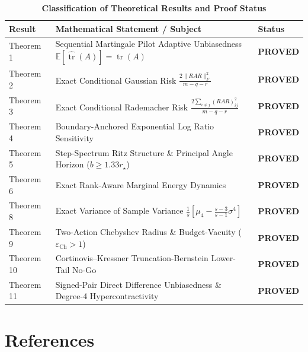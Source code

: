 \documentclass[11pt,letterpaper]{article}
\begin{document}
\begin{table}[htbp]
\centering
\caption{\textbf{Classification of Theoretical Results and Proof Status}}
\vspace{0.4em}
\small
\begin{tabular}{lp{9.5cm}l}
\toprule
\textbf{Result} & \textbf{Mathematical Statement / Subject} & \textbf{Status} \\
\midrule
Theorem 1 & Sequential Martingale Pilot Adaptive Unbiasedness $\mathbb{E}[\widehat{\operatorname{tr}}(A)] = \operatorname{tr}(A)$ & \textbf{PROVED} \\
Theorem 2 & Exact Conditional Gaussian Risk $\frac{2\|RAR\|_F^2}{m-q-r}$ & \textbf{PROVED} \\
Theorem 3 & Exact Conditional Rademacher Risk $\frac{2\sum_{i\ne j}(RAR)_{ij}^2}{m-q-r}$ & \textbf{PROVED} \\
Theorem 4 & Boundary-Anchored Exponential Log Ratio Sensitivity & \textbf{PROVED} \\
Theorem 5 & Step-Spectrum Ritz Structure \& Principal Angle Horizon ($b \ge 1.33 r_\star$) & \textbf{PROVED} \\
Theorem 6 & Exact Rank-Aware Marginal Energy Dynamics & \textbf{PROVED} \\
Theorem 8 & Exact Variance of Sample Variance $\frac{1}{s}[\mu_4 - \frac{s-3}{s-1}\sigma^4]$ & \textbf{PROVED} \\
Theorem 9 & Two-Action Chebyshev Radius \& Budget-Vacuity ($\varepsilon_{\text{Ch}} > 1$) & \textbf{PROVED} \\
Theorem 10 & Cortinovis--Kressner Truncation-Bernstein Lower-Tail No-Go & \textbf{PROVED} \\
Theorem 11 & Signed-Pair Direct Difference Unbiasedness \& Degree-4 Hypercontractivity & \textbf{PROVED} \\
\bottomrule
\end{tabular}
\end{table}

\section{References}
\end{document}
